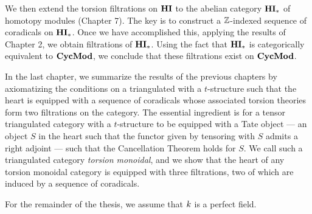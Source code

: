 We then extend the torsion
filtrations on $\mathbf{HI}$ to the abelian category $\mathbf{HI}_*$ of homotopy 
modules (Chapter 7). The key is to construct a $\mathbb{Z}$-indexed sequence
of coradicals on $\mathbf{HI}_*$. Once we have accomplished this, applying
the results of Chapter 2, we obtain filtrations of $\mathbf{HI}_*$. Using 
the fact that $\mathbf{HI}_*$ is categorically equivalent to $\mathbf{CycMod}$, we 
conclude that these filtrations exist on $\mathbf{CycMod}$. 

In the last chapter, we summarize the results of the previous 
chapters by axiomatizing the conditions on a triangulated with a 
$t$-structure such that the heart is equipped with a sequence of 
coradicals whose associated torsion theories form two filtrations 
on the category. The essential ingredient is for a tensor 
triangulated category with a $t$-structure to be equipped with a 
Tate object --- an object $S$ in the heart such that the functor 
given by tensoring with $S$ admits a right adjoint --- such that 
the Cancellation Theorem holds for $S$. We call such a 
triangulated category \emph{torsion monoidal}, and we show that 
the heart of any torsion monoidal category is equipped with three 
filtrations, two of which are induced by a sequence of coradicals.

For the remainder of the thesis, we assume that $k$ is
a perfect field.
